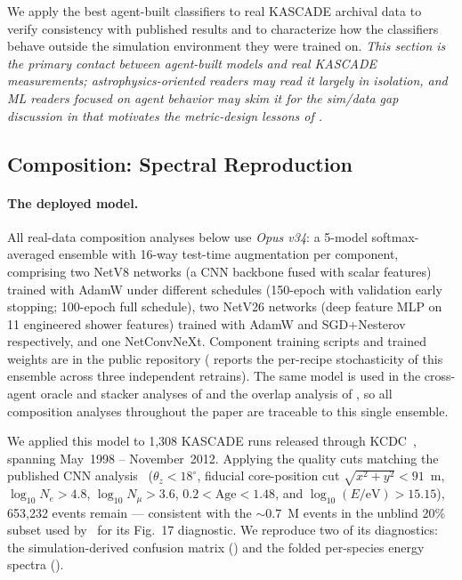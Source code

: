 \documentclass[universe,article,submit,pdftex,oneauthor]{Definitions/mdpi}
\begin{document}
We apply the best agent-built classifiers to real KASCADE archival data to verify consistency with published results and to characterize how the classifiers behave outside the simulation environment they were trained on. \emph{This section is the primary contact between agent-built models and real KASCADE measurements; astrophysics-oriented readers may read it largely in isolation, and ML readers focused on agent behavior may skim it for the sim/data gap discussion in  that motivates the metric-design lessons of .}

\subsection{Composition: Spectral Reproduction}

\paragraph{The deployed model.} All real-data composition analyses below use \emph{Opus v34}: a 5-model softmax-averaged ensemble with 16-way test-time augmentation per component, comprising two NetV8 networks (a CNN backbone fused with scalar features) trained with AdamW under different schedules (150-epoch with validation early stopping; 100-epoch full schedule), two NetV26 networks (deep feature MLP on 11 engineered shower features) trained with AdamW and SGD+Nesterov respectively, and one NetConvNeXt. Component training scripts and trained weights are in the public repository ( reports the per-recipe stochasticity of this ensemble across three independent retrains). The same model is used in the cross-agent oracle and stacker analyses of  and the overlap analysis of , so all composition analyses throughout the paper are traceable to this single ensemble.

We applied this model to 1{,}308 KASCADE runs released through KCDC~\cite{kcdc_sim_manual}, spanning May~1998 -- November~2012. Applying the quality cuts matching the published CNN analysis~\cite{kascade_jinst} ($\theta_z < 18^{\circ}$, fiducial core-position cut $\sqrt{x^2 + y^2} < 91$~m, $\log_{10} N_e > 4.8$, $\log_{10} N_\mu > 3.6$, $0.2 < \mathrm{Age} < 1.48$, and $\log_{10}(E/\mathrm{eV}) > 15.15$), 653{,}232 events remain --- consistent with the ${\sim}0.7$~M events in the unblind 20\% subset used by~\cite{kascade_jinst} for its Fig.~17 diagnostic. We reproduce two of its diagnostics: the simulation-derived confusion matrix () and the folded per-species energy spectra ().
\end{document}
